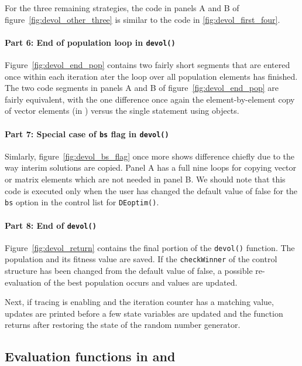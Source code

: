 \documentclass[nojss,shortnames,article]{jss}
\begin{document}
For the three remaining strategies, the code in panels A and B of
figure~\ref{fig:devol_other_three} is similar to the code in
\ref{fig:devol_first_four}.

\paragraph{Part 6: End of population loop in  \texttt{devol()}} 

Figure~\ref{fig:devol_end_pop} contains two fairly short segments that are
entered once within each iteration ater the loop over all population elements
has finished.  The two code segments in panels A and B of
figure~\ref{fig:devol_end_pop}  are fairly equivalent, with the one
difference once again the element-by-element copy of vector elements (in
) versus the single statement using  objects.

\paragraph{Part 7: Special case of \texttt{bs} flag in  \texttt{devol()}} 

Simlarly, figure~\ref{fig:devol_bs_flag} once more shows difference chiefly
due to the way interim solutions are copied. Panel A has a full nine loops
for copying vector or matrix elements which are not needed in panel B.  We
should note that this code is executed only when the user has changed the
default value of false for the \texttt{bs} option in the control list for
\texttt{DEoptim()}. 

\paragraph{Part 8: End  of  \texttt{devol()}} 

Figure~\ref{fig:devol_return} contains the final portion of the
\verb|devol()| function. The population and its fitness value are saved. If
the \texttt{checkWinner} of the control structure has been changed from the
default value of false, a possible re-evaluation of the best population
occurs and values are updated.  

Next, if tracing is enabling and the iteration counter has a matching value,
updates are printed before a few state variables are updated and the function
returns after restoring the state of the random number generator.


\subsection[Evaluation functions in R and C++]{Evaluation functions in  and }
\end{document}
